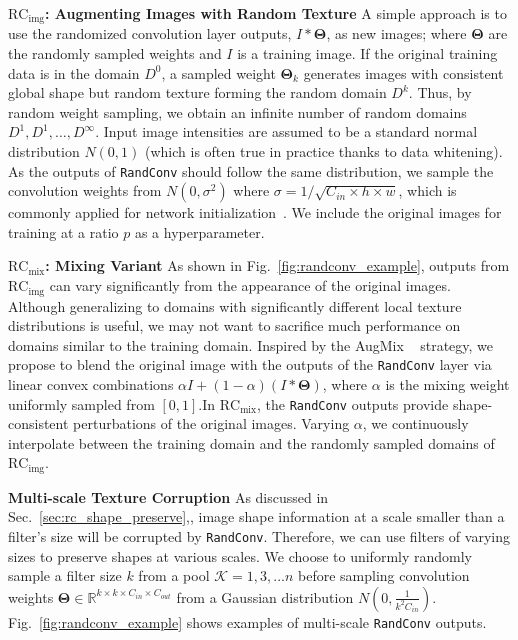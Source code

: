 \documentclass{article} \usepackage{iclr2021_conference,times}
\newcommand{\RandConv}{\texttt{RandConv}}
\begin{document}
\textbf{{$\text{RC}_{\text{img}}$}: Augmenting Images with Random Texture} A simple approach is to use the randomized convolution layer outputs, $I*\mathbf{\Theta}$, as new images; where $\mathbf{\Theta}$ are the randomly sampled weights and $I$ is a training image. If the original training data is in the domain $D^0$, a sampled weight $\mathbf{\Theta}_k$ generates images with consistent global shape but random texture forming the random domain $D^k$. Thus, by random weight sampling, we obtain an infinite number of random domains $D^1,D^1,\dots, D^\infty$. Input image intensities are assumed to be a standard normal distribution $N(0, 1)$ (which is often true in practice thanks to data whitening). As the outputs of {\RandConv} should follow the same distribution, we sample the convolution weights from $N(0, \sigma^2)$ where $\sigma =1/\sqrt{C_{in}\times h \times w}$, which is commonly applied for network initialization~\citep{he2015delving}. We include the original images for training at a ratio $p$ as a hyperparameter.

\textbf{{$\text{RC}_{\text{mix}}$}: Mixing Variant}
As shown in Fig.~\ref{fig:randconv_example}, outputs from $\text{RC}_{\text{img}}$ can vary significantly from the appearance of the original images. Although generalizing to domains with significantly different local texture distributions is useful, we may not want to sacrifice much performance on domains similar to the training domain. Inspired by the AugMix ~\citep{hendrycks2020augmix} strategy, we propose to blend the original image with the outputs of the {\RandConv} layer via linear convex combinations $\alpha I + (1-\alpha)(I*\mathbf{\Theta})$, where $\alpha$ is the mixing weight uniformly sampled from $[0,1]$.In $\text{RC}_{\text{mix}}$, the {\RandConv} outputs provide shape-consistent perturbations of the original images. Varying $\alpha$, we continuously interpolate between the training domain and the randomly sampled domains of \texttt{$\text{RC}_{\text{img}}$}.

\textbf{Multi-scale Texture Corruption} 
As discussed in Sec.~\ref{sec:rc_shape_preserve},, image shape information at a scale smaller than a filter's size will be corrupted by {\RandConv}. Therefore, we can use filters of varying sizes to preserve shapes at various scales.
We choose to uniformly randomly sample a filter size $k$ from a pool $\mathcal{K}={1,3,...n}$ before sampling convolution weights $\mathbf{\Theta}\in\mathbb{R}^{k\times k \times C_{in}\times C_{out}}$ from a Gaussian distribution $N(0, \frac{1}{k^2C_{in}})$. Fig.~\ref{fig:randconv_example} shows examples of multi-scale {\RandConv} outputs.
\end{document}
